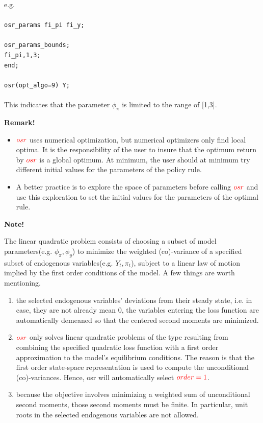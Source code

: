\documentclass[cn,10pt,math=newtx,citestyle=gb7714-2015,bibstyle=gb7714-2015]{elegantbook}
\begin{document}
	e.g.\\
	\\
	\texttt{osr\_params fi\_pi fi\_y;\\
		\\
		osr\_params\_bounds;\\
		fi\_pi,1,3;\\
		end;\\
		\\
		osr(opt\_algo=9) Y;}\\
	\\
	
	This indicates that the parameter $\phi_{\pi}$ is limited to the range of [1,3].
	
	\textsf{\textbf{Remark!}}
	\begin{itemize}
		\item $\textcolor{red}{osr}$ uses numerical optimization, but numerical optimizers only find local optima. It is the responsibility of the user to insure that the optimum return by $\textcolor{red}{osr}$ is a global optimum. At minimum, the user should at minimum try different initial values for the parameters of the policy rule.
		\item A better practice is to explore the space of parameters before calling $\textcolor{red}{osr}$ and use this exploration to set the initial values for the parameters of the optimal rule.
	\end{itemize}
	
	\textsf{\textbf{Note!}}
	
	The linear quadratic problem consists of choosing a subset of model parameters(e.g. $\phi_{\pi}, \phi_y$) to minimize the weighted (co)-variance of a specified subset of endogenous variables(e.g. $Y_t, \pi_t$), subject to a linear law of motion implied by the first order conditions of the model. A few things are worth mentioning.
	\begin{enumerate}
		\item the selected endogenous variables’ deviations from their steady state, i.e. in case, they are not already mean 0, the variables entering the loss function are automatically demeaned so that the centered second moments are minimized.
		\item $\textcolor{red}{osr}$ only solves linear quadratic problems of the type resulting from combining the specified quadratic loss function with a first order approximation to the model’s equilibrium conditions. The reason is that the first order state-space representation is used to compute the unconditional (co)-variances. Hence, osr will automatically select $\textcolor{red}{order=1}$.
		\item because the objective involves minimizing a weighted sum of unconditional second moments, those second moments must be finite. In particular, unit roots in the selected endogenous variables are not allowed.
	\end{enumerate}
	
\end{document}
